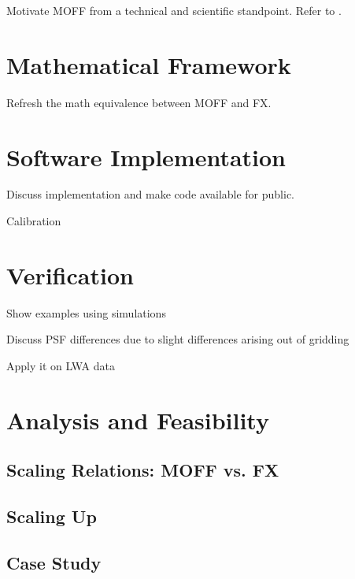 \documentclass[a4paper,fleqn,usenatbib]{../mnras}
\begin{document}
Motivate MOFF from a technical and scientific standpoint. Refer to \citet{del07,mor09,mor11}.

\section{Mathematical Framework}\label{sec:math}

Refresh the math equivalence between MOFF and FX.

\section{Software Implementation}\label{sec:software}

Discuss implementation and make code available for public.

Calibration

\section{Verification}\label{sec:verify}

Show examples using simulations

Discuss PSF differences due to slight differences arising out of gridding

Apply it on LWA data

\section{Analysis and Feasibility}\label{sec:analysis}
\subsection{Scaling Relations: MOFF vs. FX}
\subsection{Scaling Up}
\subsection{Case Study}


\end{document}
